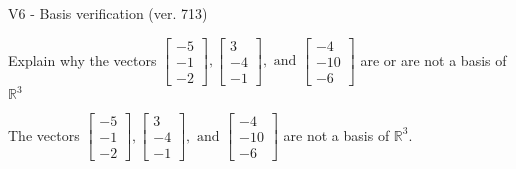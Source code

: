 \begin{exercise}
  \begin{exerciseTitle}V6 - Basis verification (ver. 713)\end{exerciseTitle}
  \begin{exerciseStatement}
    Explain why the vectors \(\left[\begin{array}{r}
-5 \\
-1 \\
-2
\end{array}\right] , \left[\begin{array}{r}
3 \\
-4 \\
-1
\end{array}\right] , \text{ and } \left[\begin{array}{r}
-4 \\
-10 \\
-6
\end{array}\right]\) are or are not a basis of \(\mathbb{R}^3\)	


  \end{exerciseStatement}
  \begin{exerciseAnswer}
   The vectors \(\left[\begin{array}{r}
-5 \\
-1 \\
-2
\end{array}\right] , \left[\begin{array}{r}
3 \\
-4 \\
-1
\end{array}\right] , \text{ and } \left[\begin{array}{r}
-4 \\
-10 \\
-6
\end{array}\right]\) 
  	 are not  a basis of \(\mathbb{R}^3\).
  


  \end{exerciseAnswer}
\end{exercise}
